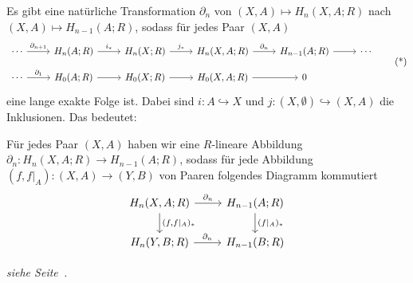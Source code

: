 \begin{satz}[{name=[Existenz der Paarsequenz]},label=satz:86]
	Es gibt eine natürliche Transformation $\partial_n$ von $(X,A) \mapsto H_n(X,A;R)$ nach $(X,A) \mapsto H_{n-1}(A;R)$, sodass für jedes Paar $(X,A)$
	\begin{equation*}
		\begin{tikzcd}[row sep=1em, column sep=2.4em]
			\cdots  \rar["\partial_{n+1}"] & H_n(A;R) \rar["i_*"] & H_n(X;R) \rar["j_*"] & H_n(X,A;R) \rar["\partial_n"] 
			& H_{n-1}(A;R) \rar & \cdots \\
			\cdots \rar["\partial_1"] & H_0(A;R) \rar & H_0(X;R) \rar & H_0(X,A;R) \rar & 0
		\end{tikzcd} \label{eq:88}\tag{*}
	\end{equation*}
	eine lange exakte Folge ist. 
	Dabei sind $i \colon A \hookrightarrow X$ und $j \colon (X,\emptyset) \hookrightarrow (X,A)$ die Inklusionen. Das bedeutet: 
	
	Für jedes Paar $(X,A)$ haben wir eine $R$-lineare Abbildung $\partial_n \colon H_n(X,A;R) \to H_{n-1}(A;R)$, sodass für jede Abbildung $(f,f|_{A}) \colon (X,A) \to (Y,B)$ von Paaren folgendes Diagramm kommutiert
	\[
		\begin{tikzcd}
			H_{n}(X,A;R) \rar["\partial_n"] \dar["{(f,f|_A)_*}"] & H_{n-1}(A;R) \dar["{(f|_A)_*}"] \\
			H_n(Y,B;R) \rar["\partial_n"] & H_{n-1}(B;R)
		\end{tikzcd}
	\]
\end{satz}
\begin{beweis}
	\emph{siehe Seite~\pageref{bew:86}.}
\end{beweis}

